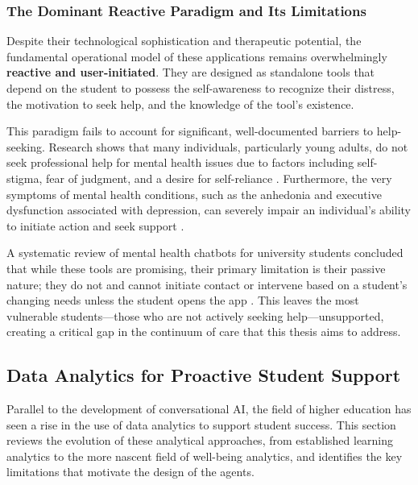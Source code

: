 \subsubsection{The Dominant Reactive Paradigm and Its Limitations}
Despite their technological sophistication and therapeutic potential, the fundamental operational model of these applications remains overwhelmingly \textbf{reactive and user-initiated}. They are designed as standalone tools that depend on the student to possess the self-awareness to recognize their distress, the motivation to seek help, and the knowledge of the tool's existence.

This paradigm fails to account for significant, well-documented barriers to help-seeking. Research shows that many individuals, particularly young adults, do not seek professional help for mental health issues due to factors including self-stigma, fear of judgment, and a desire for self-reliance \cite{corrigan2009stigmahelpseeking,patel2022helpseekingcollege}. Furthermore, the very symptoms of mental health conditions, such as the anhedonia and executive dysfunction associated with depression, can severely impair an individual's ability to initiate action and seek support \cite{liu2023distresshelpseeking}.

A systematic review of mental health chatbots for university students concluded that while these tools are promising, their primary limitation is their passive nature; they do not and cannot initiate contact or intervene based on a student's changing needs unless the student opens the app \cite{adhikari2023chatbotsreview}. This leaves the most vulnerable students—those who are not actively seeking help—unsupported, creating a critical gap in the continuum of care that this thesis aims to address.


\subsection{Data Analytics for Proactive Student Support}

Parallel to the development of conversational AI, the field of higher education has seen a rise in the use of data analytics to support student success. This section reviews the evolution of these analytical approaches, from established learning analytics to the more nascent field of well-being analytics, and identifies the key limitations that motivate the design of the agents.

